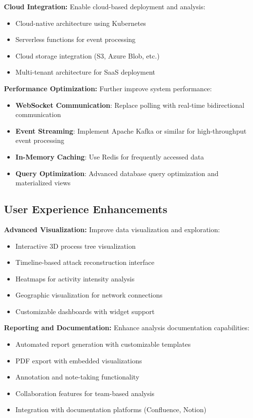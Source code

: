\textbf{Cloud Integration:}
Enable cloud-based deployment and analysis:
\begin{itemize}
    \item Cloud-native architecture using Kubernetes
    \item Serverless functions for event processing
    \item Cloud storage integration (S3, Azure Blob, etc.)
    \item Multi-tenant architecture for SaaS deployment
\end{itemize}

\textbf{Performance Optimization:}
Further improve system performance:
\begin{itemize}
    \item \textbf{WebSocket Communication}: Replace polling with real-time bidirectional communication
    \item \textbf{Event Streaming}: Implement Apache Kafka or similar for high-throughput event processing
    \item \textbf{In-Memory Caching}: Use Redis for frequently accessed data
    \item \textbf{Query Optimization}: Advanced database query optimization and materialized views
\end{itemize}

\subsection{User Experience Enhancements}

\textbf{Advanced Visualization:}
Improve data visualization and exploration:
\begin{itemize}
    \item Interactive 3D process tree visualization
    \item Timeline-based attack reconstruction interface
    \item Heatmaps for activity intensity analysis
    \item Geographic visualization for network connections
    \item Customizable dashboards with widget support
\end{itemize}

\textbf{Reporting and Documentation:}
Enhance analysis documentation capabilities:
\begin{itemize}
    \item Automated report generation with customizable templates
    \item PDF export with embedded visualizations
    \item Annotation and note-taking functionality
    \item Collaboration features for team-based analysis
    \item Integration with documentation platforms (Confluence, Notion)
\end{itemize}

